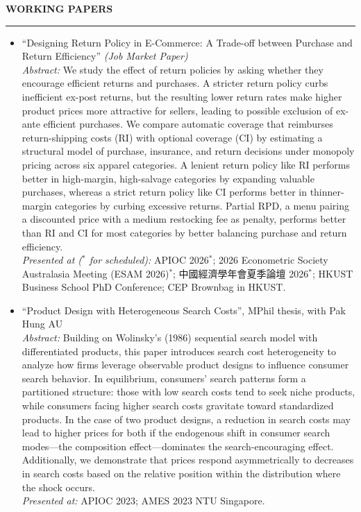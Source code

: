 \documentclass[11pt,letterpaper]{article}
\newcommand{\sectionheader}[1]{%
  \vspace{0.55em}
  {\large\bfseries #1}\\[-0.15em]
  \rule{\textwidth}{0.4pt}\par
  \vspace{0.25em}
}
\begin{document}
\vspace{-0.55em}
\sectionheader{WORKING PAPERS}
\begin{itemize}
  \item ``Designing Return Policy in E-Commerce: A Trade-off between Purchase and Return Efficiency'' \textit{(Job Market Paper)}\\[0.2em]
  \textit{Abstract:} We study the effect of return policies by asking whether they encourage efficient returns and purchases. A stricter return policy curbs inefficient ex-post returns, but the resulting lower return rates make higher product prices more attractive for sellers, leading to possible exclusion of ex-ante efficient purchases. We compare automatic coverage that reimburses return-shipping costs (RI) with optional coverage (CI) by estimating a structural model of purchase, insurance, and return decisions under monopoly pricing across six apparel categories. A lenient return policy like RI performs better in high-margin, high-salvage categories by expanding valuable purchases, whereas a strict return policy like CI performs better in thinner-margin categories by curbing excessive returns. Partial RPD, a menu pairing a discounted price with a medium restocking fee as penalty, performs better than RI and CI for most categories by better balancing purchase and return efficiency.\\[0.2em]
  \textit{Presented at ($^{\ast}$ for scheduled):} APIOC 2026$^{\ast}$; 2026 Econometric Society Australasia Meeting (ESAM 2026)$^{\ast}$; 中國經濟學年會夏季論壇 2026$^{\ast}$; HKUST Business School PhD Conference; CEP Brownbag in HKUST.

  \item ``Product Design with Heterogeneous Search Costs'', MPhil thesis, with Pak Hung AU\\[0.2em]
  \textit{Abstract:} Building on Wolinsky's (1986) sequential search model with differentiated products, this paper introduces search cost heterogeneity to analyze how firms leverage observable product designs to influence consumer search behavior. In equilibrium, consumers' search patterns form a partitioned structure: those with low search costs tend to seek niche products, while consumers facing higher search costs gravitate toward standardized products. In the case of two product designs, a reduction in search costs may lead to higher prices for both if the endogenous shift in consumer search modes---the composition effect---dominates the search-encouraging effect. Additionally, we demonstrate that prices respond asymmetrically to decreases in search costs based on the relative position within the distribution where the shock occurs.\\[0.2em]
  \textit{Presented at:} APIOC 2023; AMES 2023 NTU Singapore.
\end{itemize}
\end{document}
